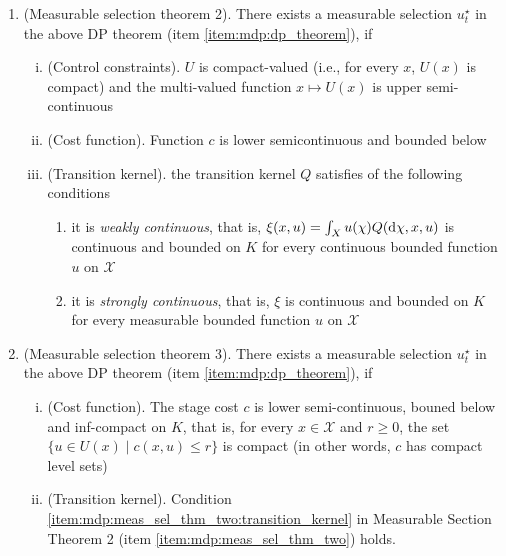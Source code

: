 \documentclass[a4paper,10pt]{scrbook}
\begin{document}
\begin{enumerate}
       
  \item \label{item:mdp:meas_sel_thm_two} (Measurable selection theorem 2). 
       There exists a measurable selection \(u_t^\star\) 
       in the above DP theorem (item \ref{item:mdp:dp_theorem}), if 
       \begin{enumerate}[i.]
        \item (Control constraints). \(U\) is compact-valued (i.e., for every \(x\), \(U(x)\) is compact)
              and the multi-valued function \(x\mapsto U(x)\) is upper semi-continuous
        \item (Cost function). Function \(c\) is lower semicontinuous and bounded below
        \item \label{item:mdp:meas_sel_thm_two:transition_kernel} 
              (Transition kernel). the transition kernel \(Q\) satisfies of the following conditions
              \begin{enumerate}
               \item it is \textit{weakly continuous}, that is, \(\xi(x,u) = \int_X u(\chi) Q(\mathrm{d} \chi, x, u)\)
                     is continuous and bounded on \(K\) for every continuous bounded function \(u\) on \(\mathcal{X}\)
               \item it is \textit{strongly continuous}, that is, \(\xi\) is continuous and bounded on \(K\)
                     for every measurable bounded function \(u\) on \(\mathcal{X}\)
              \end{enumerate}
       \end{enumerate} 
       
 \item (Measurable selection theorem 3). There exists a measurable selection \(u_t^\star\) 
       in the above DP theorem (item \ref{item:mdp:dp_theorem}), if 
       \begin{enumerate}[i.]
        \item (Cost function). The stage cost \(c\) is lower semi-continuous, bouned below and inf-compact
               on \(K\), that is, for every \(x\in \mathcal{X}\) and \(r\geq 0\), the set 
               \(\{u\in U(x) {}\mid{} c(x,u)\leq r\}\) is compact (in other words, \(c\) has compact 
               level sets)
        \item (Transition kernel). Condition \ref{item:mdp:meas_sel_thm_two:transition_kernel} in 
              Measurable Section Theorem 2 (item \ref{item:mdp:meas_sel_thm_two}) holds.
        \end{enumerate}
\end{enumerate}
\end{document}
